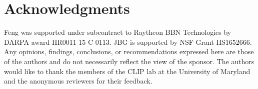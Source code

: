 \section*{Acknowledgments}
Feng was supported under subcontract to Raytheon BBN Technologies by DARPA award
HR0011-15-C-0113.
JBG is supported by NSF Grant IIS1652666.
Any opinions, findings, conclusions, or recommendations expressed here are those
of the authors and do not necessarily reflect the view of the sponsor.
The authors would like to thank the members of the CLIP lab at the University of Maryland
and the anonymous
reviewers for their feedback.
